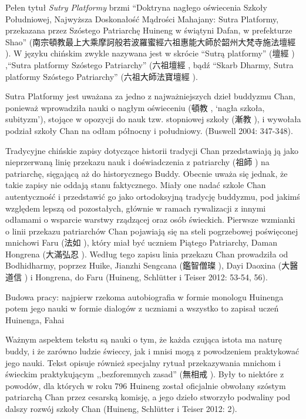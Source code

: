 Pełen tytuł \textit{Sutry Platformy} brzmi ``Doktryna nagłego oświecenia Szkoły Południowej, Najwyższa Doskonałość Mądrości Mahajany: Sutra Platformy, przekazana przez Szóstego Patriarchę Huineng w świątyni Dafan, w prefekturze Shao'' (南宗頓教最上大乘摩訶般若波羅蜜經六祖惠能大師於韶州大梵寺施法壇經 ). W języku chińskim zwykle nazywana jest w skrócie ``Sutrą platformy'' (壇經 ) ,``Sutra platformy Szóstego Patriarchy'' (六祖壇經 , bądź ``Skarb Dharmy, Sutra platformy Szóstego Patriarchy'' (六祖大師法寶壇經 ).

Sutra Platformy jest uważana za jedno z najważniejszych dzieł buddyzmu Chan, ponieważ wprowadziła nauki o nagłym oświeceniu (頓教 , `nagła szkoła, subityzm'), stojące w opozycji do nauk tzw. stopniowej szkoły (漸教 ), i wywołała podział szkoły Chan na odłam północny i południowy. %
(Buswell 2004: 347-348).%

Tradycyjne chińskie zapisy dotyczące historii tradycji Chan przedstawiają ją jako nieprzerwaną linię przekazu nauk i doświadczenia z patriarchy (祖師 ) na patriarchę, sięgającą aż do historycznego Buddy.
Obecnie uważa się jednak, że takie zapisy nie oddają stanu faktycznego.
Miały one nadać szkole Chan autentyczność i przedstawić go jako ortodoksyjną tradycję buddyzmu, pod jakimś względem lepszą od pozostałych, głównie w ramach rywalizacji z innymi odłamami o wsparcie warstwy rządzącej oraz osób świeckich.
Pierwsze wzmianki o linii przekazu patriarchów Chan pojawiają się na steli pogrzebowej poświęconej mnichowi Faru (法如 ), który miał być uczniem Piątego Patriarchy, Daman Hongrena (大滿弘忍 ).
Według tego zapisu linia przekazu Chan prowadziła od Bodhidharmy, poprzez Huike, Jianzhi Sengcana (鑑智僧璨 ), Dayi Daoxina (大醫道信 ) i Hongrena, do Faru (Huineng, Schlütter i Teiser 2012: 53-54, 56).

Budowa pracy: najpierw rzekoma autobiografia w formie monologu Huinenga
potem jego nauki w formie dialogów z uczniami
a wszystko to zapisał uczeń Huinenga, Fahai
\fi

Ważnym aspektem tekstu są nauki o tym, że każda czująca istota ma naturę buddy, i że zarówno ludzie świeccy, jak i mnisi mogą z powodzeniem praktykować jego nauki.
Tekst opisuje również specjalny rytuał przekazywania mnichom i świeckim praktykującym ,,bezforemnych zasad'' (無相戒 ). %
Były to niektóre z powodów, dla których w roku 796 Huineng został oficjalnie obwołany szóstym patriarchą Chan przez cesarską komisję, a jego dzieło stworzyło podwaliny pod dalszy rozwój szkoły Chan
(Huineng, Schlütter i Teiser 2012: 2).
